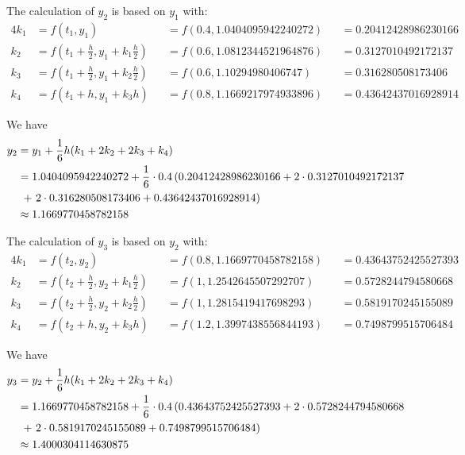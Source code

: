 \documentclass[a4paper]{article}
\begin{document}
The calculation of \(y_2\) is based on \(y_1\) with:
\begin{alignat*}{4}
  k_1 & = f(t_1, y_1)                                            &  & = f(0.4, 1.0404095942240272) &  & = 0.20412428986230166 \\
  k_2 & = f \left(t_1 + \frac{h}{2}, y_1 + k_1\frac{h}{2}\right) &  & = f(0.6, 1.0812344521964876) &  & = 0.3127010492172137  \\
  k_3 & = f \left(t_1 + \frac{h}{2}, y_1 + k_2\frac{h}{2}\right) &  & = f(0.6, 1.10294980406747)   &  & = 0.316280508173406   \\
  k_4 & = f(t_1 + h, y_1 + k_3h)                                 &  & = f(0.8, 1.1669217974933896) &  & = 0.43642437016928914
\end{alignat*}

We have
\begin{align*}
  y_2 & = y_1 + \frac{1}{6}h(k_1 + 2k_2 + 2k_3 + k_4)                                                             \\
      & = 1.0404095942240272 + \frac{1}{6} \cdot 0.4\left(0.20412428986230166 + 2 \cdot 0.3127010492172137\right. \\
      & \;\left.+\ 2 \cdot 0.316280508173406 + 0.43642437016928914\vphantom{1}\right)                             \\
      & \approx 1.1669770458782158
\end{align*}

The calculation of \(y_3\) is based on \(y_2\) with:
\begin{alignat*}{4}
  k_1 & = f(t_2, y_2)                                            &  & = f(0.8, 1.1669770458782158) &  & = 0.43643752425527393 \\
  k_2 & = f \left(t_2 + \frac{h}{2}, y_2 + k_1\frac{h}{2}\right) &  & = f(1, 1.2542645507292707)   &  & = 0.5728244794580668  \\
  k_3 & = f \left(t_2 + \frac{h}{2}, y_2 + k_2\frac{h}{2}\right) &  & = f(1, 1.2815419417698293)   &  & = 0.5819170245155089  \\
  k_4 & = f(t_2 + h, y_2 + k_3h)                                 &  & = f(1.2, 1.3997438556844193) &  & = 0.7498799515706484
\end{alignat*}

We have
\begin{align*}
  y_3 & = y_2 + \frac{1}{6}h(k_1 + 2k_2 + 2k_3 + k_4)                                                             \\
      & = 1.1669770458782158 + \frac{1}{6} \cdot 0.4\left(0.43643752425527393 + 2 \cdot 0.5728244794580668\right. \\
      & \;\left.+\ 2 \cdot 0.5819170245155089 + 0.7498799515706484\vphantom{1}\right)                             \\
      & \approx 1.4000304114630875
\end{align*}
\end{document}
